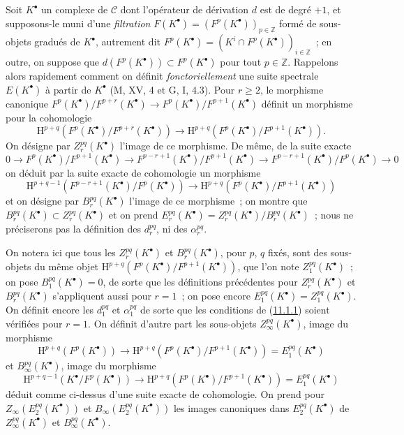 \begin{env}[11.2.2]
\label{0.11.2.2-fr}
Soit $K^\bullet$ un complexe de $\mathcal C$ dont l'opérateur de dérivation
$d$ est de degré $+1$, et supposons-le muni d'une \emph{filtration}
$F(K^\bullet)=(F^p(K^\bullet))_{p\in\mathbb Z}$ formé de sous-
objets gradués de $K^\bullet$, autrement dit
$F^p(K^\bullet)=(K^i\cap F^p(K^\bullet))_{i\in\mathbb Z}$~; en outre, on
suppose que $d(F^p(K^\bullet))\subset F^p(K^\bullet)$ pour tout
$p\in\mathbb Z$. Rappelons alors rapidement comment on définit
\emph{fonctoriellement} une suite spectrale $E(K^\bullet)$ à partir de
$K^\bullet$ (M, XV, 4 et G, I, 4.3). Pour $r\geq2$, le morphisme canonique
$F^p(K^\bullet)/F^{p+r}(K^\bullet)\to
F^p(K^\bullet)/F^{p+1}(K^\bullet)$ définit un morphisme pour la cohomologie
\[
  \mathrm H^{p+q}(F^p(K^\bullet)/F^{p+r}(K^\bullet))
  \longrightarrow
  \mathrm H^{p+q}(F^p(K^\bullet)/F^{p+1}(K^\bullet)).
\]
On désigne par $Z_r^{pq}(K^\bullet)$ l'image de ce morphisme. De même, de la
suite exacte
\[
  0\to F^p(K^\bullet)/F^{p+1}(K^\bullet)
  \to F^{p-r+1}(K^\bullet)/F^{p+1}(K^\bullet)
  \to F^{p-r+1}(K^\bullet)/F^p(K^\bullet)\to0
\]
on déduit par la suite exacte de cohomologie un morphisme
\[
  \mathrm H^{p+q-1}(F^{p-r+1}(K^\bullet)/F^p(K^\bullet))
  \longrightarrow
  \mathrm H^{p+q}(F^p(K^\bullet)/F^{p+1}(K^\bullet))
\]
et on désigne par $B_r^{pq}(K^\bullet)$ l'image de ce morphisme~; on montre
que $B_r^{pq}(K^\bullet)\subset Z_r^{pq}(K^\bullet)$ et on prend
$E_r^{pq}(K^\bullet)=Z_r^{pq}(K^\bullet)/B_r^{pq}(K^\bullet)$~; nous ne
préciserons pas la définition des $d_r^{pq}$, ni des $\alpha_r^{pq}$.

On notera ici que tous les $Z_r^{pq}(K^\bullet)$ et
$B_r^{pq}(K^\bullet)$, pour $p$, $q$ fixés, sont des sous-objets du même
objet
$\mathrm H^{p+q}(F^p(K^\bullet)/F^{p+1}(K^\bullet))$, que l'on note
$Z_1^{pq}(K^\bullet)$~; on pose $B_1^{pq}(K^\bullet)=0$, de sorte que les
définitions précédentes pour $Z_r^{pq}(K^\bullet)$ et
$B_r^{pq}(K^\bullet)$ s'appliquent aussi pour $r=1$~; on pose encore
$E_1^{pq}(K^\bullet)=Z_1^{pq}(K^\bullet)$. On définit encore les $d_1^{pq}$
et $\alpha_1^{pq}$ de sorte que les conditions de
(\hyperref[0.11.1.1-fr]{11.1.1}) soient vérifiées pour $r=1$. On définit
d'autre part les sous-objets $Z_\infty^{pq}(K^\bullet)$, image du morphisme
\[
  \mathrm H^{p+q}(F^p(K^\bullet))\longrightarrow
  \mathrm H^{p+q}(F^p(K^\bullet)/F^{p+1}(K^\bullet))
  =E_1^{pq}(K^\bullet)
\]
et $B_\infty^{pq}(K^\bullet)$, image du morphisme
\[
  \mathrm H^{p+q-1}(K^\bullet/F^p(K^\bullet))\longrightarrow
  \mathrm H^{p+q}(F^p(K^\bullet)/F^{p+1}(K^\bullet))
  =E_1^{pq}(K^\bullet)
\]
déduit comme ci-dessus d'une suite exacte de cohomologie. On prend pour
$Z_\infty(E_2^{pq}(K^\bullet))$ et $B_\infty(E_2^{pq}(K^\bullet))$ les
images canoniques dans $E_2^{pq}(K^\bullet)$ de
$Z_\infty^{pq}(K^\bullet)$ et $B_\infty^{pq}(K^\bullet)$.


\end{env}
